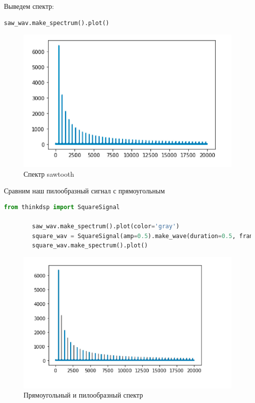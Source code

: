 \documentclass[a4paper, 14pt]{extarticle}
\begin{document}
    Выведем спектр:

    \begin{lstlisting}[language=Python, caption= Вывод спектра sawtooth, label={lst:sawtooth_spectr}]
        saw_wav.make_spectrum().plot()
    \end{lstlisting}

    \begin{figure}[H]
        \centering
        \includegraphics[width=\textwidth]{sawtooth_spectr}
        \caption{Спектр sawtooth}
        \label{fig:sawtooth_spectr}
    \end{figure}

    Сравним наш пилообразный сигнал с прямоугольным

    \begin{lstlisting}[language=Python, caption= Изображение спектра, label={lst:square_sawtooth_spectr_plot}]
        from thinkdsp import SquareSignal

        saw_wav.make_spectrum().plot(color='gray')
        square_wav = SquareSignal(amp=0.5).make_wave(duration=0.5, framerate=40000)
        square_wav.make_spectrum().plot()
    \end{lstlisting}

    \begin{figure}[H]
        \centering
        \includegraphics[width=\textwidth]{square_sawtooth_spectr}
        \caption{Прямоугольный и пилообразный спектр}
        \label{fig:square_sawtooth_spectr}
    \end{figure}
\end{document}
